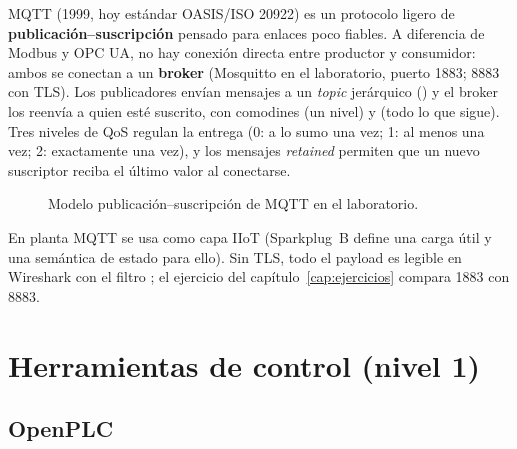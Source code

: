 MQTT (1999, hoy estándar OASIS/ISO 20922) es un protocolo ligero de \textbf{publicación--suscripción} pensado para enlaces poco fiables. A diferencia de Modbus y OPC UA, no hay conexión directa entre productor y consumidor: ambos se conectan a un \textbf{broker} (Mosquitto en el laboratorio, puerto 1883; 8883 con TLS). Los publicadores envían mensajes a un \emph{topic} jerárquico () y el broker los reenvía a quien esté suscrito, con comodines \cmd{+} (un nivel) y \cmd{\#} (todo lo que sigue). Tres niveles de QoS regulan la entrega (0: a lo sumo una vez; 1: al menos una vez; 2: exactamente una vez), y los mensajes \emph{retained} permiten que un nuevo suscriptor reciba el último valor al conectarse.

\begin{figure}[H]
\centering
{}
\caption{Modelo publicación--suscripción de MQTT en el laboratorio.}
\label{fig:mqtt}
\end{figure}

En planta MQTT se usa como capa IIoT (Sparkplug~B define una carga útil y una semántica de estado para ello). Sin TLS, todo el payload es legible en Wireshark con el filtro ; el ejercicio del capítulo~\ref{cap:ejercicios} compara 1883 con 8883.

\section{Herramientas de control (nivel 1)}
\label{sec:control}

\subsection{OpenPLC}

